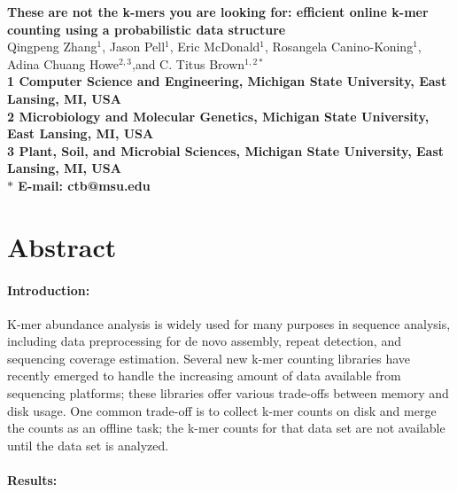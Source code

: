 \documentclass{article}
\begin{document}
\begin{flushleft}
{\Large \textbf{These are not the k-mers you are looking for: efficient
online k-mer counting using a probabilistic data structure}}
\\
Qingpeng Zhang$^{1}$, 
Jason Pell$^{1}$,
Eric McDonald$^{1}$,
Rosangela Canino-Koning$^{1}$,
Adina Chuang Howe$^{2,3}$,and 
C. Titus Brown$^{1,2\ast}$
\\
\bf{1} Computer Science and Engineering, Michigan State University, East Lansing, MI, USA
\\
\bf{2} Microbiology and Molecular Genetics, Michigan State University, East Lansing, MI, USA
\\
\bf{3} Plant, Soil, and Microbial Sciences, Michigan State University, East Lansing, MI, USA
\\
$\ast$ E-mail: ctb@msu.edu
\end{flushleft}

\section{Abstract}

\paragraph{Introduction:}

K-mer abundance analysis is widely used for many purposes in sequence
analysis, including data preprocessing for de novo assembly, repeat
detection, and sequencing coverage estimation.  Several
new k-mer counting libraries have recently emerged  to handle the increasing
amount of data available from sequencing platforms; these libraries
offer various trade-offs between memory and disk usage.  One common
trade-off is to collect k-mer counts on disk and merge the counts as an
offline task; the k-mer counts for that data set are not available
until the data set is analyzed.

\paragraph{Results:}
\end{document}
